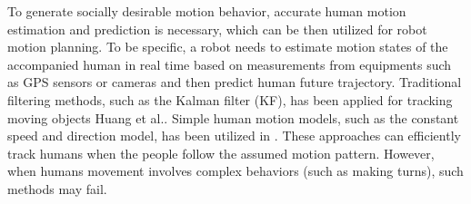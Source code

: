 \documentclass[letterpaper, 10 pt, conference]{ieeeconf}
\newcommand{\todonote}[1]{\vspace{0px} %
	\todo[inline, color=green!30]{\textbf{[Note:]} {#1}} %
}
\newcommand{\todohere}[1]{\hl{(\textbf{TODO:} #1)}}
\begin{document}
	To generate socially desirable motion behavior, accurate human motion estimation and prediction is necessary, which can be then utilized for robot motion planning.
	To be specific, a robot needs to estimate motion states of the accompanied human in real time based on measurements from equipments such as GPS sensors or cameras and then predict human future trajectory.
	Traditional filtering methods, such as the Kalman filter (KF), has been applied for tracking moving objects Huang et al.\cite {koller1994robust,Future_Trajectory,cosgun2013autonomous}.
	Simple human motion models, such as the constant speed and direction model, has been utilized in \cite{svenstrup2010trajectory,bruce2004better}.
	These approaches can efficiently track humans when the people follow the assumed motion pattern.
	However, when humans movement involves complex behaviors (such as making turns), such methods may fail.
	
	
\end{document}

